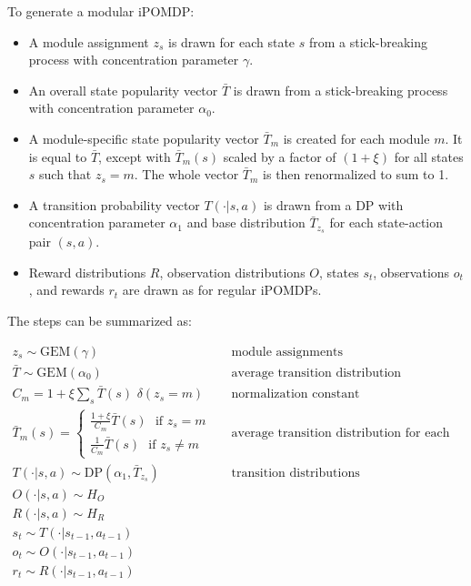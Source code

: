 \documentclass[11pt]{article}
\begin{document}
To generate a modular iPOMDP:

\begin{itemize}
\item A module assignment $z_s$ is drawn for each state $s$ from a stick-breaking process with concentration parameter $\gamma$.
\item An overall state popularity vector $\bar{T}$ is drawn from a stick-breaking process with concentration parameter $\alpha_0$.
\item A module-specific state popularity vector $\bar{T}_m$ is created for each module $m$. It is equal to $\bar{T}$, except with $\bar{T}_m(s)$ scaled by a factor of $(1 + \xi)$ for all states $s$ such that $z_s = m$. The whole vector $\bar{T}_m$ is then renormalized to sum to 1.
\item A transition probability vector $T(\cdot | s,a)$ is drawn from a DP with concentration parameter $\alpha_1$ and base distribution $\bar{T}_{z_s}$ for each state-action pair $(s,a)$.
\item Reward distributions $R$, observation distributions $O$, states $s_t$, observations $o_t$, and rewards $r_t$ are drawn as for regular iPOMDPs.
\end{itemize}

The steps can be summarized as:

\begin{align*}
z_s \sim \text{GEM}(\gamma)   		&& \text{module assignments} \\
\bar{T} \sim \text{GEM}(\alpha_0)     		&& \text{average transition distribution} \\
C_m =  1 + \xi {\sum_s \bar{T}(s) \,\, \delta(z_s = m) }   		&& \text{normalization constant} \\
\bar{T}_m(s) = \begin{cases} \frac{1 + \xi}{C_m} \bar{T}(s)  \,\, \text{ if }  z_s = m \\  \frac{1}{C_m} \bar{T}(s) \,\, \text{ if } z_s \ne m \end{cases}     		&& \text{average transition distribution for each module} \\ 
T(\cdot | s,a) \sim \text{DP}(\alpha_1, \bar{T}_{z_s}) 		 && \text{transition distributions}\\
O(\cdot | s,a) \sim H_O \\
R(\cdot | s,a) \sim H_R \\
s_t \sim T(\cdot | s_{t-1},a_{t-1}) \\
o_t \sim O(\cdot | s_{t-1}, a_{t-1}) \\
r_t \sim R(\cdot | s_{t-1}, a_{t-1}) 
\end{align*}
\end{document}
